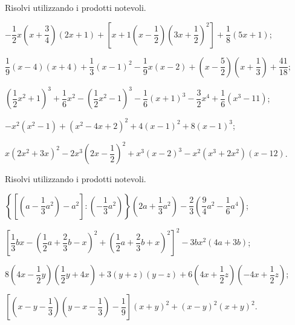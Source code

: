 \begin{esercizio}[\Ast]
 \label{ese:12.37}
Risolvi utilizzando i prodotti notevoli.
 \begin{enumeratea}
 \item $-{\dfrac{1}{2}x}\left(x+\dfrac{3}{4}\right)(2x+1)+\left[x+1\left(x-\dfrac{1}{2}\right)\left(3x+\dfrac{1}{2}\right)^{2}\right]+\dfrac{1}{8}(5x+1)$;
 \item $\dfrac{1}{9}(x-4)(x+4)+\dfrac{1}{3}(x-1)^{2}-\dfrac{1}{9}x(x-2)+\left(x-\dfrac{5}{2}\right)\left(x+\dfrac{1}{3}\right)+\dfrac{41}{18}$;
 \item $\left(\dfrac{1}{2}x^{2}+1\right)^{3}+\dfrac{1}{6}x^{2}-\left(\dfrac{1}{2}x^{2}-1\right)^{3}-\dfrac{1}{6}(x+1)^{3}-\dfrac{3}{2}x^{4}+\dfrac{1}{6}\left(x^3-11\right)$;
 \item $-x^{2}\left(x^{2}-1\right)+\left(x^{2}-4x+2\right)^{2}+4(x-1)^{2}+8(x-1)^{3}$;
 \item $x\left(2x^{2}+3x\right)^{2}-2x^{3}\left(2x-\dfrac{1}{2}\right)^{2}+x^{3}(x-2)^{3}-x^{2}\left(x^{3}+2x^{2}\right)(x-12)$.
 \end{enumeratea}
\end{esercizio}
\begin{esercizio}[\Ast]
 \label{ese:12.38}
Risolvi utilizzando i prodotti notevoli.
 \begin{enumeratea}
 \item $\left\lbrace\left[\left(a-\dfrac{1}{3}a^{2}\right)-a^{2}\right]:\left(-\dfrac{1}{3}a^{2}\right)\right\rbrace\left(2a+\dfrac{1}{3}a^{2}\right)-\dfrac{2}{3}\left(\dfrac{9}{4}a^{2}-\dfrac{1}{6}a^{4}\right)$;
 \item $\left[\dfrac{1}{3}bx-\left(\dfrac{1}{2}a+\dfrac{2}{3}b-x\right)^{2}+\left(\dfrac{1}{2}a+\dfrac{2}{3}b+x\right)^{2}\right]^{2}-3bx^{2}(4a+3b)$;
 \item $8\left(4x-\dfrac{1}{2}y\right)\left(\dfrac{1}{2}y+4x\right)+3(y+z)(y-z)+6\left(4x+\dfrac{1}{2}z\right)\left(-4x+\dfrac{1}{2}z\right)$;
 \item $\left[\left(x-y-\dfrac{1}{3}\right)\left(y-x-\dfrac{1}{3}\right)-\dfrac{1}{9}\right](x+y)^{2}+(x-y)^{2}(x+y)^{2}$.
 \end{enumeratea}
\end{esercizio}

